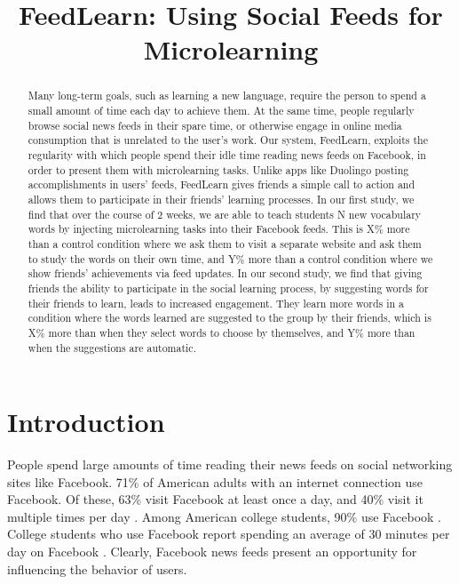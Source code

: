 \documentclass{chi-ext}
\title{FeedLearn: Using Social Feeds for Microlearning}
\author{
  \alignauthor{
  	\textbf{Geza Kovacs}\\
  	\affaddr{Department of Computer Science, Stanford University}\\
  	\email{geza@cs.stanford.edu}
  }
}
\def\plainkeywords{microlearning, social feeds, language learning}
\begin{document}
\maketitle

\begin{abstract}
Many long-term goals, such as learning a new language,
require the person to spend a small amount of time each day to achieve them.
At the same time, people regularly browse social news feeds in their spare time, or otherwise
engage in online media consumption that is unrelated to the user's work.
Our system, FeedLearn, exploits the regularity with which people spend their idle time reading news feeds on Facebook,
in order to present them with microlearning tasks. Unlike apps like Duolingo posting accomplishments in users' feeds, FeedLearn gives friends a simple call to action and allows them to participate in their friends' learning processes.
In our first study, we find that over the course of 2 weeks, we are able to teach students N new vocabulary words by injecting microlearning tasks into their Facebook feeds. This is X\% more than a control condition where we ask them to visit a separate website and ask them to study the words on their own time, and Y\% more than a control condition where we show friends' achievements via feed updates. In our second study, we find that giving friends the ability to participate in the social learning process, by suggesting words for their friends to learn, leads to increased engagement. They learn more words in a condition where the words learned are suggested to the group by their friends, which is X\% more than when they select words to choose by themselves, and Y\% more than when the suggestions are automatic.
\end{abstract}

\keywords{\plainkeywords}



\section{Introduction}

People spend large amounts of time reading their news feeds on social networking sites like Facebook.
71\% of American adults with an internet connection use Facebook. Of these, 63\% visit Facebook at least once a day, and 40\% visit it multiple times per day \cite{socialmediaupdate}. Among American college students, 90\% use Facebook \cite{collegefacebook2}. College students who use Facebook report spending an average of 30 minutes per day on Facebook \cite{collegefacebook}. Clearly, Facebook news feeds present an opportunity for influencing the behavior of users.
\end{document}

